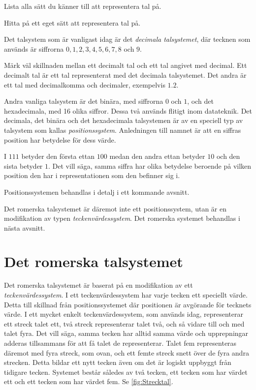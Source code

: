 \begin{exercise}\label{xrc:HittaTalsystem}
  Lista alla sätt du känner till att representera tal på.
\end{exercise}
\begin{exercise}\label{xrc:SkapaTalsystem}
  Hitta på ett eget sätt att representera tal på.
\end{exercise}

Det talsystem som är vanligast idag är det \emph{decimala talsystemet}, där
tecknen som används är siffrorna \(0, 1, 2, 3, 4, 5, 6, 7, 8\) och \(9\).
\begin{remark}
  Märk väl skillnaden mellan ett decimalt tal och ett tal angivet med decimal.
  Ett decimalt tal är ett tal representerat med det decimala talsystemet.
  Det andra är ett tal med decimalkomma och decimaler, exempelvis
  \(1.2\).
\end{remark}
Andra vanliga talsystem är det binära, med siffrorna \(0\) och \(1\), och det
hexadecimala, med 16 olika siffror.
Dessa två används flitigt inom datateknik.
Det decimala, det binära och det hexadecimala talsystemen är av en speciell
typ av talsystem som kallas \emph{positionssystem}.
Anledningen till namnet är att en siffras position har betydelse för dess
värde.
\begin{example}\label{ex:PositionensBetydelse}
  I \(111\) betyder den första ettan \(100\) medan den andra ettan
  betyder \(10\) och den sista betyder \(1\).
  Det vill säga, samma siffra har olika betydelse beroende på vilken position
  den har i representationen som den befinner sig i.
\end{example}
Positionssystemen behandlas i detalj i ett kommande avsnitt.

Det romerska talsystemet är däremot inte ett positionssystem, utan är en
modifikation av typen \emph{teckenvärdessystem}.
Det romerska systemet behandlas i nästa avsnitt.


\section{Det romerska talsystemet}%
%
\label{sec:RomerskaTalsystemet}
Det romerska talsystemet är baserat på en modifikation av ett
\emph{teckenvärdessystem}.
I ett teckenvärdessystem har varje tecken ett speciellt värde.
Detta till skillnad från positionssystemet där positionen är avgörande för
tecknets värde.
I ett mycket enkelt teckenvärdessystem, som används idag, representerar ett
streck talet ett, två streck representerar talet två, och så vidare till och
med talet fyra.
Det vill säga, samma tecken har alltid samma värde och upprepningar adderas
tillsammans för att få talet de representerar.
Talet fem representeras däremot med fyra streck, som ovan, och ett femte streck
snett över de fyra andra strecken.
Detta bildar ett nytt tecken även om det är logiskt uppbyggt från tidigare
tecken.
Systemet består således av två tecken, ett tecken som har värdet ett och ett
tecken som har värdet fem.
Se \cref{fig:Strecktal}.

